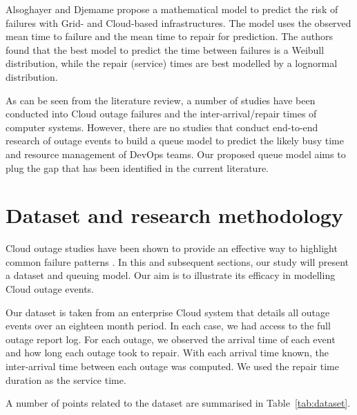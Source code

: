 \documentclass[5p]{elsarticle}
\begin{document}
Alsoghayer and Djemame \cite {alsoghayer2014resource} propose a mathematical model to predict the risk of failures with Grid- and Cloud-based infrastructures. The model uses the observed mean time to failure and the mean time to repair for prediction. The authors found that the best model to predict the time between failures is a Weibull distribution, while the repair (service) times are best modelled by a lognormal distribution.

As can be seen from the literature review, a number of studies have been conducted into Cloud outage failures and the inter-arrival/repair times of computer systems. However, there are no studies that conduct end-to-end research of outage events to build a queue model to predict the likely busy time and resource management of DevOps teams. Our proposed queue model aims to plug the gap that has been identified in the current literature.

\section{Dataset and research methodology}

Cloud outage studies have been shown to provide an effective way to highlight common failure patterns \cite{InfoWorld2015outage}. In this and subsequent sections, our study will present a dataset and queuing model. Our aim is to illustrate its efficacy in modelling Cloud outage events. 

Our dataset is taken from an enterprise Cloud system that details all outage events over an eighteen month period. In each case, we had access to the full outage report log. For each outage, we observed the arrival time of each event and how long each outage took to repair. With each arrival time known, the inter-arrival time between each outage was computed. We used the repair time duration as the service time.

A number of points related to the dataset are summarised in Table~\ref{tab:dataset}. 
\end{document}
